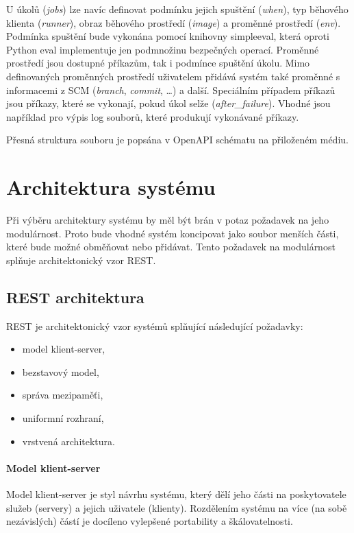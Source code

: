 U úkolů (\textit{jobs}) lze navíc definovat podmínku jejich spuštění (\textit{when}), typ běhového klienta (\textit{runner}), obraz běhového prostředí (\textit{image}) a proměnné prostředí (\textit{env}).
Podmínka spuštění bude vykonána pomocí knihovny simpleeval, která oproti Python eval implementuje jen podmnožinu bezpečných operací.
Proměnné prostředí jsou dostupné příkazům, tak i podmínce spuštění úkolu.
Mimo definovaných proměnných prostředí uživatelem přidává systém také proměnné s informacemi z SCM (\textit{branch}, \textit{commit}, \ldots) a další.
Speciálním případem příkazů jsou příkazy, které se vykonají, pokud úkol selže (\textit{after\_failure}).
Vhodné jsou například pro výpis log souborů, které produkují vykonávané příkazy.

Přesná struktura souboru je popsána v OpenAPI schématu na přiloženém médiu.

\section{Architektura systému}

Při výběru architektury systému by měl být brán v potaz požadavek na jeho modulárnost.
Proto bude vhodné systém koncipovat jako soubor menších části, které bude možné obměňovat nebo přidávat.
Tento požadavek na modulárnost splňuje architektonický vzor REST.

\subsection{REST architektura}

REST je architektonický vzor systémů splňující následující požadavky:

\begin{itemize}
    \item model klient-server,
    \item bezstavový model,
    \item správa mezipaměťi,
    \item uniformní rozhraní,
    \item vrstvená architektura. \cite{rest}
\end{itemize}

\paragraph{Model klient-server}

Model klient-server je styl návrhu systému, který dělí jeho části na poskytovatele služeb (servery) a jejich uživatele (klienty).
Rozdělením systému na více (na sobě nezávislých) částí je docíleno vylepšené portability a škálovatelnosti.

